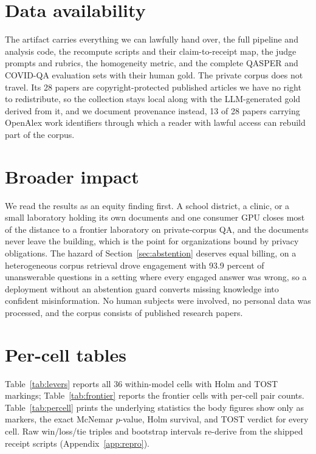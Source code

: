 \documentclass[11pt]{article}
\begin{document}
\section*{Data availability}
The artifact carries everything we can lawfully hand over, the full pipeline and analysis code, the recompute scripts and their claim-to-receipt map, the judge prompts and rubrics, the homogeneity metric, and the complete QASPER and COVID-QA evaluation sets with their human gold. The private corpus does not travel. Its 28 papers are copyright-protected published articles we have no right to redistribute, so the collection stays local along with the LLM-generated gold derived from it, and we document provenance instead, 13 of 28 papers carrying OpenAlex work identifiers through which a reader with lawful access can rebuild part of the corpus.

\section*{Broader impact}
We read the results as an equity finding first. A school district, a clinic, or a small laboratory holding its own documents and one consumer GPU closes most of the distance to a frontier laboratory on private-corpus QA, and the documents never leave the building, which is the point for organizations bound by privacy obligations. The hazard of Section~\ref{sec:abstention} deserves equal billing, on a heterogeneous corpus retrieval drove engagement with 93.9 percent of unanswerable questions in a setting where every engaged answer was wrong, so a deployment without an abstention guard converts missing knowledge into confident misinformation. No human subjects were involved, no personal data was processed, and the corpus consists of published research papers.




\appendix

\section{Per-cell tables}
\label{app:cells}
Table~\ref{tab:levers} reports all 36 within-model cells with Holm and TOST markings; Table~\ref{tab:frontier} reports the frontier cells with per-cell pair counts. Table~\ref{tab:percell} prints the underlying statistics the body figures show only as markers, the exact McNemar $p$-value, Holm survival, and TOST verdict for every cell. Raw win/loss/tie triples and bootstrap intervals re-derive from the shipped receipt scripts (Appendix~\ref{app:repro}).
\end{document}
